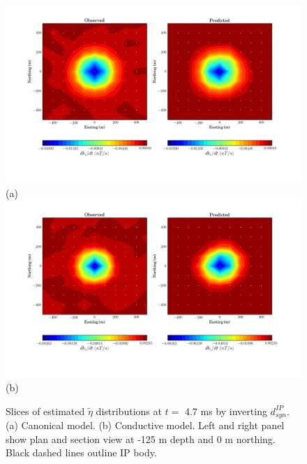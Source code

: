 \documentclass[a4paper, 11pt]{article}
\newcommand{\peta}{\tilde{\eta}}
\begin{document}
\begin{figure}[htb]
  \centering
  \includegraphics[width=\textwidth]{figures/synthetic/ObsPred_syn_ch38_case1.png}\\
  (a)
  \includegraphics[width=\textwidth]{figures/synthetic/ObsPred_syn_ch38_case2.png}\\
  (b)
  \caption{Slices of estimated $\peta$ distributions at $t = $ 4.7 ms by inverting $d^{IP}_{syn}$. (a) Canonical model. (b)  Conductive model. Left and right panel show plan and section view at -125 m depth and 0 m northing. Black dashed lines outline IP body. }
  \label{F: ObsPred_syn_ch38}
\end{figure}
\end{document}
